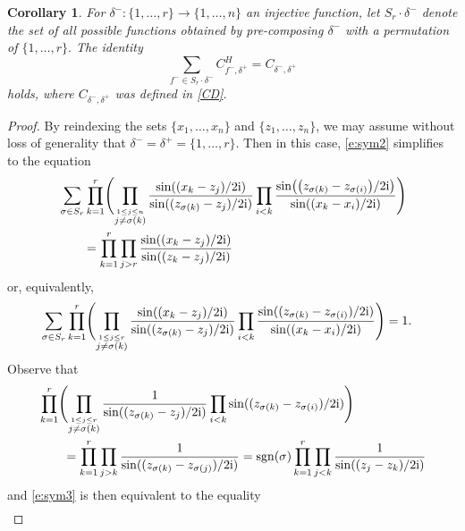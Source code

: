 \documentclass[pdftex]{sigma}
\newtheorem{Corollary}[Theorem]{Corollary}
\numberwithin{equation}{section}
\newcommand{\op}[1]{\operatorname{#1}}
\newcommand{\z}{z}
\newcommand{\x}{x}
\begin{document}
\begin{Corollary} For $\delta^-\colon \{1, \dots, r\} \to \{1, \dots, n\}$ an injective function, let $S_r \cdot \delta^-$ denote the set of all possible functions obtained by pre-composing $\delta^-$ with a permutation of $\{1, \dots, r\}.$
The identity
\begin{equation}\label{e:sym2}
\sum_{f^- \in S_r \cdot \delta^-} C^H_{f^-, \delta^+}=C_{\delta^-, \delta^+}
\end{equation}
holds, where $C_{\delta^-, \delta^+}$ was defined in \eqref{CD}.
\end{Corollary}

\begin{proof}
By reindexing the sets $\{\x_1, \dots, \x_n\}$ and $\{\z_1, \dots, \z_n\}$, we may assume without loss of generality that $\delta^- = \delta^+ = \{1, \dots, r\}$. Then in this case, \eqref{e:sym2} simplifies to the equation
\begin{align*}
&\sum_{\sigma \in S_r} \prod_{k=1}^r \Biggl(\prod_{\stackrel{1 \leq j \leq n}{j\neq {\sigma(k)}}}\frac{ \sin( ( \x_{k}- \z_j)/2 {\rm i}) }{\sin(( \z_{\sigma(k)}- \z_j)/2 {\rm i})} \prod_{i<k} \frac{\sin\bigl(\bigl(\z_{\sigma(k)} - \z_{\sigma(i)}\bigr)/2{\rm i}\bigr)}{ \sin((\x_{k} - \x_{i})/2{\rm i})}\Biggr) \nonumber\\
&\qquad{}= \prod_{k=1}^r \prod_{j > r}\frac{ \sin( ( \x_{k}- \z_j)/2 {\rm i}) }{\sin(( \z_{k}- \z_j )/2 {\rm i})}
\end{align*}
or, equivalently,
\begin{align}
&\sum_{\sigma \in S_r} \prod_{k=1}^r \Biggl(\prod_{\stackrel{1 \leq j \leq r}{j\neq {\sigma(k)}}}\frac{ \sin( ( \x_{k}- \z_j)/2 {\rm i}) }{\sin(( \z_{\sigma(k)}- \z_j)/2 {\rm i})} \prod_{i<k} \frac{\sin((\z_{\sigma(k)} - \z_{\sigma(i)})/2{\rm i})}{ \sin((\x_{k} - \x_{i})/2{\rm i})}\Biggr)
= 1 .
\label{e:sym3}
\end{align}
Observe that
\begin{align*}
& \prod_{k=1}^r\Biggl( \prod_{\stackrel{1 \leq j \leq r}{j\neq {\sigma(k)}}} \frac{ 1}{\sin(( \z_{\sigma(k)}- \z_j)/2 {\rm i})}
 \prod_{i<k} \sin((\z_{\sigma(k)} - \z_{\sigma(i)})/2{\rm i}) \Biggr)\\
&\qquad{} = \prod_{k=1}^r \prod_{j>k} \frac{ 1}{\sin(( \z_{\sigma(k)}- \z_{\sigma(j)})/2 {\rm i})}
 = \op{sgn}(\sigma) \prod_{k=1}^r \prod_{j<k} \frac{ 1}{\sin(( \z_{j}- \z_{k})/2 {\rm i})}
\end{align*}
and \eqref{e:sym3} is then equivalent to the equality
\begin{align}

\end{align}
\end{proof}
\end{document}

